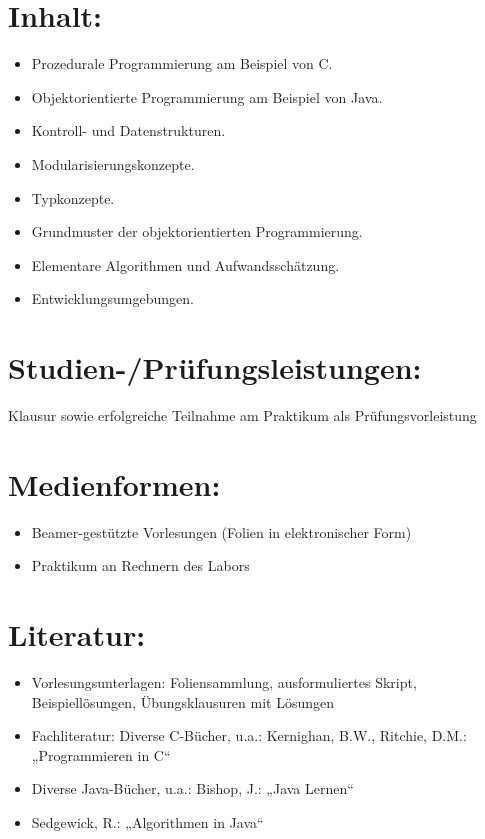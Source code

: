 \section*{Inhalt:}\label{inhalt}

\begin{itemize}
\item
  Prozedurale Programmierung am Beispiel von C.
\item
  Objektorientierte Programmierung am Beispiel von Java.
\item
  Kontroll- und Datenstrukturen.
\item
  Modularisierungskonzepte.
\item
  Typkonzepte.
\item
  Grundmuster der objektorientierten Programmierung.
\item
  Elementare Algorithmen und Aufwandsschätzung.
\item
  Entwicklungsumgebungen.
\end{itemize}

\section*{Studien-/Prüfungsleistungen:}\label{studien-pruxfcfungsleistungen}

Klausur sowie erfolgreiche Teilnahme am Praktikum als
Prüfungsvorleistung

\section*{Medienformen:}\label{medienformen}

\begin{itemize}
\item
  Beamer-gestützte Vorlesungen (Folien in elektronischer Form)
\item
  Praktikum an Rechnern des Labors
\end{itemize}

\section*{Literatur:}\label{literatur}

\begin{itemize}
\item
  Vorlesungsunterlagen: Foliensammlung, ausformuliertes Skript,
  Beispiellösungen, Übungsklausuren mit Lösungen
\item
  Fachliteratur: Diverse C-Bücher, u.a.: Kernighan, B.W., Ritchie, D.M.:
  „Programmieren in C``
\item
  Diverse Java-Bücher, u.a.: Bishop, J.: „Java Lernen``
\item
  Sedgewick, R.: „Algorithmen in Java``
\end{itemize}

